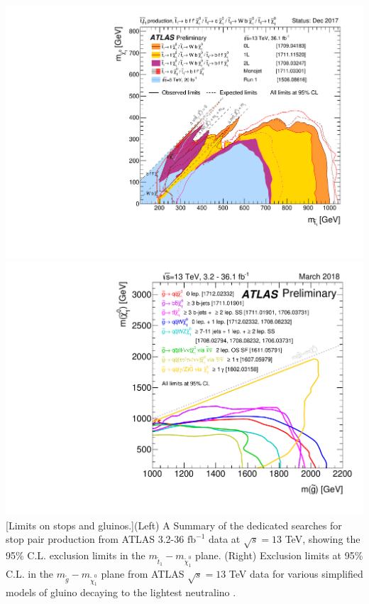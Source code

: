 \begin{center}
\includegraphics[scale=0.35]{figures/ATLAS_SUSY_Stop_tLSP.pdf}
\includegraphics[scale=0.35,trim={0 0.85cm 0 0},clip]{figures/ATLAS_SUSY_Strong_all.pdf}
[Limits on stops and gluinos.]{(Left) A Summary of the dedicated searches for stop pair production from ATLAS 3.2-36 $\text{fb}^{-1}$ data at $\sqrt{s}=13$ TeV, showing the 95\% C.L. exclusion limits in the $m_{\tilde{t}_1}-m_{\tilde{\chi}^0_1}$ plane. (Right) Exclusion limits at 95\% C.L. in the $m_{\tilde{g}}-m_{\tilde{\chi}^0_1}$ plane from ATLAS $\sqrt{s}=13$ TeV data for various simplified models of gluino decaying to the lightest neutralino \cite{RN695}.}
\label{fig:SUSYlimits}
\end{center}
